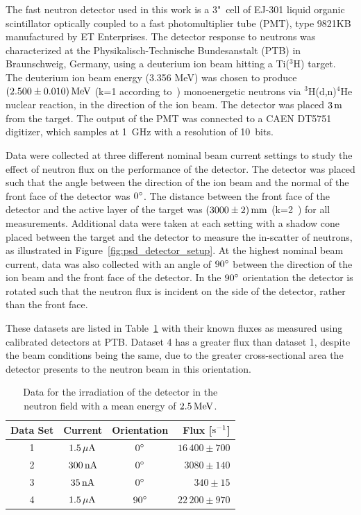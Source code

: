 The fast neutron detector used in this work is a 3"~cell of EJ-301 liquid organic scintillator optically coupled to a fast photomultiplier tube (PMT), type 9821KB manufactured by ET Enterprises. The detector response to neutrons was characterized at the Physikalisch-Technische Bundesanstalt (PTB) in Braunschweig, Germany,  using a deuterium ion beam hitting a Ti($^3$H) target. The deuterium ion beam energy (3.356 MeV) was chosen to produce $(2.500\pm 0.010)\,\mathrm{MeV}$ (k=1 according to~\cite{GUM}) monoenergetic neutrons via $^{3}$H(d,n)$^{4}$He nuclear reaction, in the direction of the ion beam. The detector was placed $3\,\mathrm{m}$ from the target. The output of the PMT was connected to a CAEN DT5751 digitizer, which samples at 1~GHz with a resolution of 10~bits.

Data were collected at three different nominal beam current settings to study the effect of neutron flux on the performance of the detector. The detector was placed such that the angle between the direction of the ion beam and the normal of the front face of the detector was $0{}^{\circ}$. The distance between the front face of the detector and the active layer of the target was $(3000\pm 2)\,\mathrm{mm}$ (k=2~\cite{GUM}) for all measurements. Additional data were taken at each setting with a shadow cone placed between the target and the detector to measure the in-scatter of neutrons, as illustrated in Figure~\ref{fig:psd_detector_setup}. At the highest nominal beam current, data was also collected with an angle of $90{}^{\circ}$ between the direction of the ion beam and the front face of the detector. In the $90{}^{\circ}$ orientation the detector is rotated such that the neutron flux is incident on the side of the detector, rather than the front face.

These datasets are listed in Table~\ref{tab:psd_datasets} with their known fluxes as measured using calibrated detectors at PTB. Dataset 4 has a greater flux than dataset 1, despite the beam conditions being the same, due to the greater cross-sectional area the detector presents to the neutron beam in this orientation.

\begin{table}[htbp]
    \caption{Data for the irradiation of the detector in the neutron field with a mean energy of $2.5\,\mathrm{MeV}$. }\label{tab:psd_datasets}
\centering
    \begin{tabular}{c c c r }
        \hline
        Data Set & Current & Orientation & \;\; Flux [$\mathrm{s^{-1}}$] \\
        \hline
        1 & $1.5\,\mathrm{\mu A}$ & $0{}^{\circ}$ & \;$16\,400 \pm 700$ \\
        2 & $300\,\mathrm{nA}$ & $0{}^{\circ}$ & \;$3080 \pm 140$\\
        3 & $35\,\mathrm{nA}$ & $0{}^{\circ}$ & \;$340 \pm 15$\\
        4 & $1.5\,\mathrm{\mu A}$ & $90{}^{\circ}$ & \;$22\,200 \pm 970$\\
        \hline
    \end{tabular}
\end{table}

